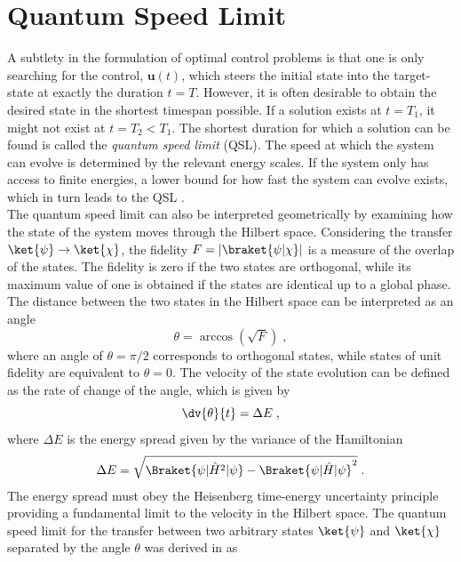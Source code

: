 \section{Quantum Speed Limit}
A subtlety in the formulation of optimal control problems is that one is only searching for the control, $\boldsymbol{u}(t)$, which steers the initial state into the target-state at exactly the duration $t = T$. However, it is often desirable to obtain the desired state in the shortest timespan possible. If a solution exists at $t= T_1$, it might not exist at $t = T_2 < T_1$. The shortest duration for which a solution can be found is called the \textit{quantum speed limit} (QSL). The speed at which the system can evolve is determined by the relevant energy scales. If the system only has access to finite energies, a lower bound for how fast the system can evolve exists, which in turn leads to the QSL \cite{Caneva2009}.\\
The quantum speed limit can also be interpreted geometrically by examining how the state of the system moves through the Hilbert space. Considering the transfer $\ket{\psi} \to \ket{\chi}$, the fidelity $F = |\braket{\psi | \chi}|$ is a measure of the overlap of the states. The fidelity is zero if the two states are orthogonal, while its maximum value of one is obtained if the states are identical up to a global phase. The distance between the two states in the Hilbert space can be interpreted as an angle \cite{Wootters1981}
\begin{equation}
	\theta = \arccos \left( \sqrt{F} \right) \; ,
\end{equation}
where an angle of $\theta = \pi / 2 $ corresponds to orthogonal states, while states of unit fidelity are equivalent to $\theta = 0 $. The velocity of the state evolution can be defined as the rate of change of the angle, which is given by \cite{Aharonov}
\begin{equation}
	\dv{\theta}{t} = \Delta E \; ,
\end{equation}
where $\Delta E$ is the energy spread given by the variance of the Hamiltonian
\begin{equation}
	\Delta E  =  \sqrt{\Braket{\psi | \hat{H}^ 2 | \psi} - \Braket{\psi | \hat{H} | \psi} ^ 2 } \; .
\end{equation}
The energy spread must obey the Heisenberg time-energy uncertainty principle providing a fundamental limit to the velocity in the Hilbert space. The quantum speed limit for the transfer between two arbitrary states $\ket{\psi}$ and $\ket{\chi}$ separated by the angle $\theta$ was derived in \cite{Mandelstam1991} as
